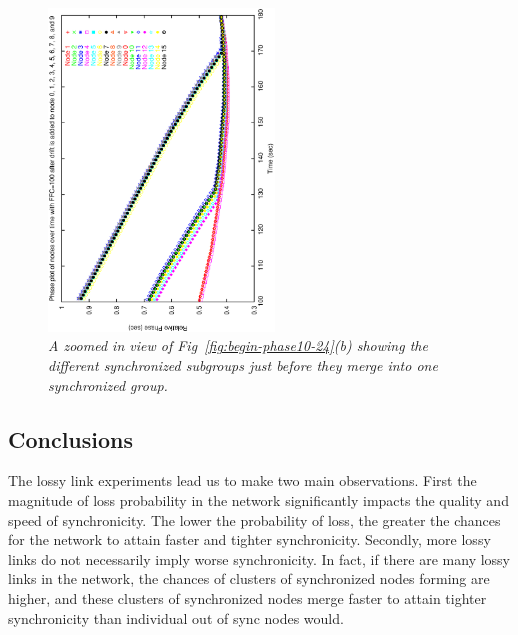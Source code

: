 \begin{figure}
\centerline{%
\includegraphics[width=6cm,angle=270]{figures/24-links-loss-0.5-run-6-phase.ps}
}
\caption{ {\it A zoomed in view of Fig~\ref{fig:begin-phase10-24}(b) showing
the different synchronized subgroups just before they merge into one synchronized group.}}
\label{fig:phase24}
\end{figure}

\subsection{Conclusions}

The lossy link experiments lead us to make two main observations. First the magnitude of loss probability 
in the network significantly
impacts the quality and speed of synchronicity. The lower the probability of loss, the greater the chances for 
the network to attain faster and tighter synchronicity. Secondly, more lossy links do not necessarily imply
worse synchronicity.  In fact, if there are many lossy links in the network, the chances of clusters of
synchronized nodes forming are higher, and these clusters of synchronized nodes merge faster to attain
tighter synchronicity than individual out of sync nodes would.

\newpage

